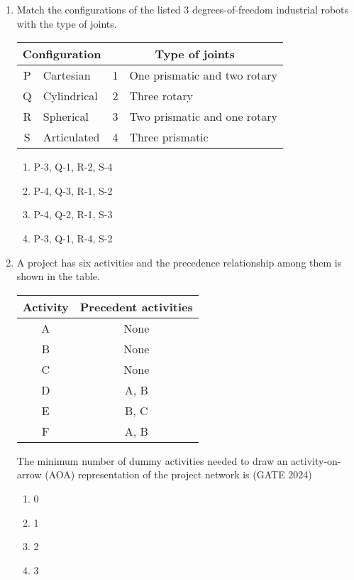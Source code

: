 \documentclass[journal,12pt,onecolumn]{IEEEtran}
\theoremstyle{remark}
\begin{document}
\begin{enumerate}
\item Match the configurations of the listed 3 degrees-of-freedom industrial robots with the type of joints.
\begin{center}
\begin{tabular}{|c|l|c|l|}
\hline
\multicolumn{2}{|c|}{\textbf{Configuration}} & \multicolumn{2}{|c|}{\textbf{Type of joints}} \\
\hline
P & Cartesian & 1 & One prismatic and two rotary \\
Q & Cylindrical & 2 & Three rotary \\
R & Spherical & 3 & Two prismatic and one rotary \\
S & Articulated & 4 & Three prismatic \\
\hline
\end{tabular}
\end{center}
\begin{multicols}{4}
\begin{enumerate}
    \item P-3, Q-1, R-2, S-4
    \item P-4, Q-3, R-1, S-2
    \item P-4, Q-2, R-1, S-3
    \item P-3, Q-1, R-4, S-2
\end{enumerate}
\end{multicols}
\vspace{1cm}
\item A project has six activities and the precedence relationship among them is shown in the table.
\begin{center}
\begin{tabular}{|c|c|}
\hline
Activity & Precedent activities \\
\hline
A & None \\
B & None \\
C & None \\
D & A, B \\
E & B, C \\
F & A, B \\
\hline
\end{tabular}
\end{center}
The minimum number of dummy activities needed to draw an activity-on-arrow (AOA) representation of the project network is
\hfill{(GATE 2024)}
\begin{multicols}{4}
\begin{enumerate}
    \item 0
    \item 1
    \item 2
    \item 3
\end{enumerate}
\end{multicols}
\vspace{1cm}


\end{enumerate}
\end{document}

